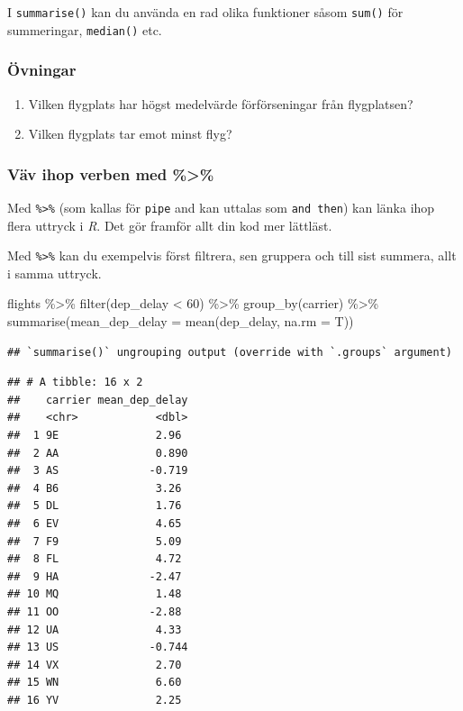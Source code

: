 \documentclass[
]{book}
\newenvironment{Shaded}{\begin{snugshade}}{\end{snugshade}}
\newcommand{\AttributeTok}[1]{\textcolor[rgb]{0.77,0.63,0.00}{#1}}
\newcommand{\DecValTok}[1]{\textcolor[rgb]{0.00,0.00,0.81}{#1}}
\newcommand{\FunctionTok}[1]{\textcolor[rgb]{0.00,0.00,0.00}{#1}}
\newcommand{\NormalTok}[1]{#1}
\newcommand{\SpecialCharTok}[1]{\textcolor[rgb]{0.00,0.00,0.00}{#1}}
\providecommand{\tightlist}{%
  \setlength{\itemsep}{0pt}\setlength{\parskip}{0pt}}
\begin{document}
I \texttt{summarise()} kan du använda en rad olika funktioner såsom \texttt{sum()} för summeringar, \texttt{median()} etc.

\hypertarget{uxf6vningar-1}{%
\subsubsection{Övningar}\label{uxf6vningar-1}}

\begin{enumerate}
\def\labelenumi{\arabic{enumi}.}
\tightlist
\item
  Vilken flygplats har högst medelvärde förförseningar från flygplatsen?
\item
  Vilken flygplats tar emot minst flyg?
\end{enumerate}

\hypertarget{vuxe4v-ihop-verben-med}{%
\subsubsection{Väv ihop verben med \%\textgreater\%}\label{vuxe4v-ihop-verben-med}}

Med \texttt{\%\textgreater{}\%} (som kallas för \texttt{pipe} and kan uttalas som \texttt{and\ then}) kan länka ihop flera uttryck i \emph{R}. Det gör framför allt din kod mer lättläst.

Med \texttt{\%\textgreater{}\%} kan du exempelvis först filtrera, sen gruppera och till sist summera, allt i samma uttryck.

\begin{Shaded}
\begin{Highlighting}[]
\NormalTok{flights }\SpecialCharTok{\%\textgreater{}\%}
\FunctionTok{filter}\NormalTok{(dep\_delay }\SpecialCharTok{\textless{}} \DecValTok{60}\NormalTok{) }\SpecialCharTok{\%\textgreater{}\%}
\FunctionTok{group\_by}\NormalTok{(carrier) }\SpecialCharTok{\%\textgreater{}\%}
\FunctionTok{summarise}\NormalTok{(}\AttributeTok{mean\_dep\_delay =} \FunctionTok{mean}\NormalTok{(dep\_delay, }\AttributeTok{na.rm =}\NormalTok{ T))}
\end{Highlighting}
\end{Shaded}

\begin{verbatim}
## `summarise()` ungrouping output (override with `.groups` argument)
\end{verbatim}

\begin{verbatim}
## # A tibble: 16 x 2
##    carrier mean_dep_delay
##    <chr>            <dbl>
##  1 9E               2.96 
##  2 AA               0.890
##  3 AS              -0.719
##  4 B6               3.26 
##  5 DL               1.76 
##  6 EV               4.65 
##  7 F9               5.09 
##  8 FL               4.72 
##  9 HA              -2.47 
## 10 MQ               1.48 
## 11 OO              -2.88 
## 12 UA               4.33 
## 13 US              -0.744
## 14 VX               2.70 
## 15 WN               6.60 
## 16 YV               2.25
\end{verbatim}
\end{document}
